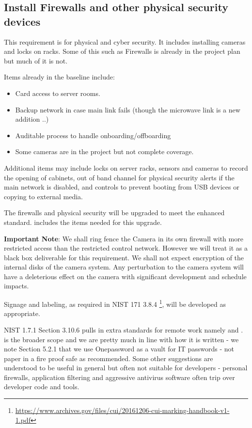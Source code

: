 
\subsection{Install Firewalls and other physical security devices} \label{sec:2firewalls}

This requirement is for physical and cyber security. It includes installing cameras and locks on racks.
Some of this such as Firewalls is already in the project plan but much of it is not.

Items already in the baseline include:
\begin{itemize}
\item Card access to server rooms.
\item Backup network in case main link fails (though the microwave link is a new addition ..)
\item Auditable process to handle onboarding/offboarding
\item Some cameras are in the project but not complete coverage.

\end{itemize}

Additional items may include locks on server racks, sensors and cameras to record the opening of  cabinets, out of band channel for physical security alerts if the main network is disabled, and controls to  prevent booting from USB devices or copying to external media.

The firewalls and physical security will be upgraded to meet the enhanced standard.  includes the items needed for this upgrade.

{\bf Important Note}: We shall ring fence the \gls{Camera} in its own firewall with more restricted access than the restricted control network.
However we will treat it as a black box deliverable for this requirement. We shall not expect encryption of the internal disks of the \gls{camera} system. Any perturbation to the \gls{camera} system will have a deleterious effect on the \gls{camera} with significant development and schedule impacts.

Signage and labeling, as required in \gls{NIST} 171 3.8.4 \footnote{\url{https://www.archives.gov/files/cui/20161206-cui-marking-handbook-v1-1.pdf}}, will be developed as appropriate.

NIST 1.7.1 Section 3.10.6 pulls in extra standards for remote work namely  and .
 is the broader scope and we are pretty much in line with how it is written - we note Section 5.2.1 that we use Onepassword as a vault for \gls{IT} passwords - not paper in a fire proof safe as recommended.
Some other suggestions are understood to be useful in general but often not suitable for developers - personal firewalls, application filtering  and aggressive antivirus \gls{software} often trip over developer code and tools.

